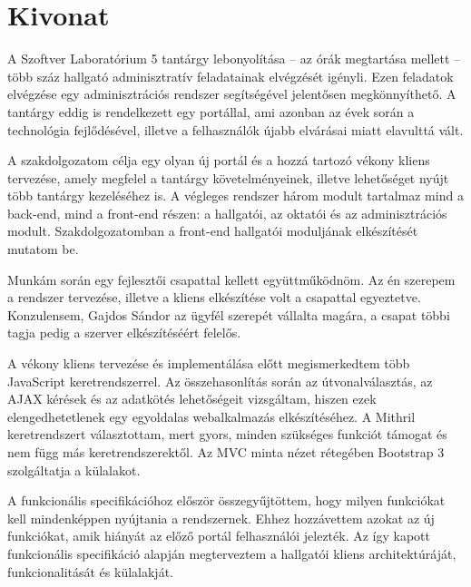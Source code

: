 \setcounter{page}{1}

\hungarianParagraph


\chapter*{Kivonat}

A Szoftver Laboratórium 5 tantárgy lebonyolítása -- az órák megtartása mellett -- több száz hallgató adminisztratív feladatainak elvégzését igényli. Ezen feladatok elvégzése egy adminisztrációs rendszer segítségével jelentősen megkönnyíthető. A tantárgy eddig is rendelkezett egy portállal, ami azonban az évek során a technológia fejlődésével, illetve a felhasználók újabb elvárásai miatt elavulttá vált.

A szakdolgozatom célja egy olyan új portál és a hozzá tartozó vékony kliens tervezése, amely megfelel a tantárgy követelményeinek, illetve lehetőséget nyújt több tantárgy kezeléséhez is. A végleges rendszer három modult tartalmaz mind a back-end, mind a front-end részen: a hallgatói, az oktatói és az adminisztrációs modult. Szakdolgozatomban a front-end hallgatói moduljának elkészítését mutatom be. 

Munkám során egy fejlesztői csapattal kellett együttműködnöm. Az én szerepem a rendszer tervezése, illetve a kliens elkészítése volt a csapattal egyeztetve. Konzulensem, Gajdos Sándor az ügyfél szerepét vállalta magára, a csapat többi tagja pedig a szerver elkészítéséért felelős.

A vékony kliens tervezése és implementálása előtt megismerkedtem több JavaScript keretrendszerrel. Az összehasonlítás során az útvonalválasztás, az AJAX kérések és az adatkötés lehetőségeit vizsgáltam, hiszen ezek elengedhetetlenek egy egyoldalas webalkalmazás elkészítéséhez. A Mithril keretrendszert választottam, mert gyors, minden szükséges funkciót támogat és nem függ más keretrendszerektől. Az MVC minta nézet rétegében Bootstrap 3 szolgáltatja a külalakot.

A funkcionális specifikációhoz először összegyűjtöttem, hogy milyen funkciókat kell mindenképpen nyújtania a rendszernek. Ehhez hozzávettem azokat az új funkciókat, amik hiányát az előző portál felhasználói jelezték. Az így kapott funkcionális specifikáció alapján megterveztem a hallgatói kliens architektúráját, funkcionalitását és külalakját.

